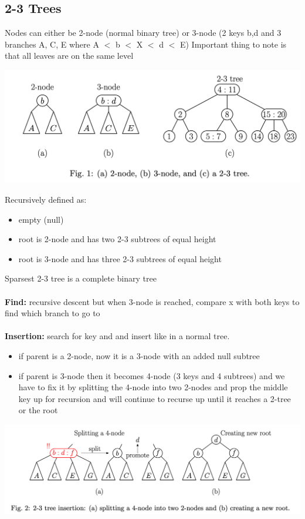 \documentclass{article}
\begin{document}
  \subsection{2-3 Trees}
  Nodes can either be 2-node (normal binary tree) or 3-node (2 keys b,d and 3 branches A, C, E where A $<$ b $<$ X $<$ d $<$ E)
  Important thing to note is that all leaves are on the same level
  \begin{center}
  \includegraphics[scale=0.2]{2-3Tree}
  \end{center}
  Recursively defined as:
  \begin{itemize}[noitemsep]
  \item empty (null)
  \item root is 2-node and has two 2-3 subtrees of equal height
  \item root is 3-node and has three 2-3 subtrees of equal height
  \end{itemize}
  Sparsest 2-3 tree is a complete binary tree \\ \\
  \textbf{Find: }recursive descent but when 3-node is reached, compare x with both keys to find which branch to go to\\ \\
  \textbf{Insertion: }search for key and and insert like in a normal tree.
  \begin{itemize}[noitemsep]
  \item if parent is a 2-node, now it is a 3-node with an added null subtree
  \item if parent is 3-node then it becomes 4-node (3 keys and 4 subtrees) and we have to fix it by splitting the 4-node into two 2-nodes and prop the middle key up for recursion and will continue to recurse up until it reaches  a 2-tree or the root
  \end{itemize}
  \begin{center}
  \includegraphics[scale=0.2]{2-3TreeInsert}
  \end{center}
\end{document}
